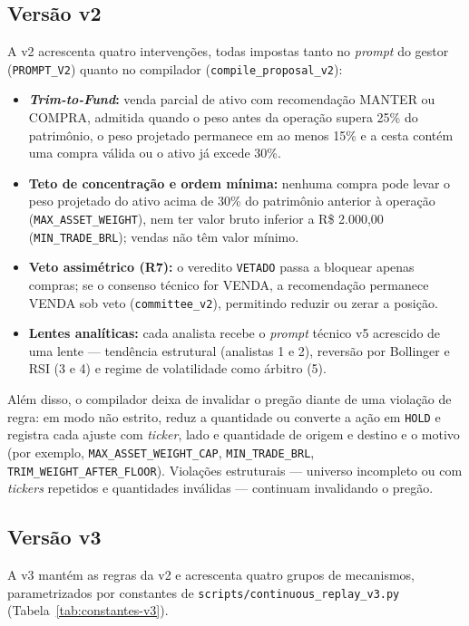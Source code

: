 \subsection{Versão v2}

A v2 acrescenta quatro intervenções, todas impostas tanto no \textit{prompt} do gestor (\texttt{PROMPT\_V2}) quanto no compilador (\texttt{compile\_proposal\_v2}):

\begin{itemize}
  \item \textbf{\textit{Trim-to-Fund}:} venda parcial de ativo com recomendação MANTER ou COMPRA, admitida quando o peso antes da operação supera 25\% do patrimônio, o peso projetado permanece em ao menos 15\% e a cesta contém uma compra válida ou o ativo já excede 30\%.
  \item \textbf{Teto de concentração e ordem mínima:} nenhuma compra pode levar o peso projetado do ativo acima de 30\% do patrimônio anterior à operação (\texttt{MAX\_ASSET\_WEIGHT}), nem ter valor bruto inferior a R\$ 2.000,00 (\texttt{MIN\_TRADE\_BRL}); vendas não têm valor mínimo.
  \item \textbf{Veto assimétrico (R7):} o veredito \texttt{VETADO} passa a bloquear apenas compras; se o consenso técnico for VENDA, a recomendação permanece VENDA sob veto (\texttt{committee\_v2}), permitindo reduzir ou zerar a posição.
  \item \textbf{Lentes analíticas:} cada analista recebe o \textit{prompt} técnico v5 acrescido de uma lente --- tendência estrutural (analistas 1 e 2), reversão por Bollinger e RSI (3 e 4) e regime de volatilidade como árbitro (5).
\end{itemize}

Além disso, o compilador deixa de invalidar o pregão diante de uma violação de regra: em modo não estrito, reduz a quantidade ou converte a ação em \texttt{HOLD} e registra cada ajuste com \textit{ticker}, lado e quantidade de origem e destino e o motivo (por exemplo, \texttt{MAX\_ASSET\_WEIGHT\_CAP}, \texttt{MIN\_TRADE\_BRL}, \texttt{TRIM\_WEIGHT\_AFTER\_FLOOR}). Violações estruturais --- universo incompleto ou com \textit{tickers} repetidos e quantidades inválidas --- continuam invalidando o pregão.

\subsection{Versão v3}

A v3 mantém as regras da v2 e acrescenta quatro grupos de mecanismos, parametrizados por constantes de \texttt{scripts/continuous\_replay\_v3.py} (Tabela~\ref{tab:constantes-v3}).

